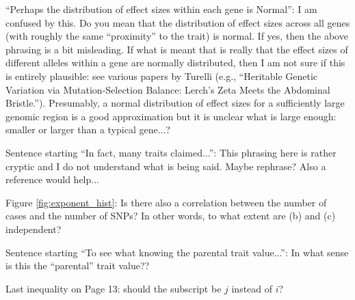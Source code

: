 \reply{
}

\begin{point}{\revref}
    ``Perhaps the distribution of effect sizes within each gene is Normal'': I am confused by this. Do you mean that the distribution of effect sizes across all genes (with roughly the same ``proximity'' to the trait) is normal. If yes, then the above phrasing is a bit misleading. If what is meant that is really that the effect sizes of different alleles within a gene are normally distributed, then I am not sure if this is entirely plausible: see various papers by Turelli (e.g., ``Heritable Genetic Variation via Mutation-Selection Balance: Lerch's Zeta Meets the Abdominal Bristle.''). Presumably, a normal distribution of effect sizes for a sufficiently large genomic region is a good approximation but it is unclear what is large enough: smaller or larger than a typical gene...?
\end{point}


\begin{point}{\revref}
    Sentence starting ``In fact, many traits claimed...'': This phrasing here is rather cryptic and I do not understand what is being said. Maybe rephrase? Also a reference would help...
\end{point}

\reply{
}

\begin{point}{}
    Figure \ref{fig:exponent_hist}: Is there also a correlation between the number of cases and the number of SNPs? In other words, to what extent are (b) and (c) independent?
\end{point}


\begin{point}{\revref}
    Sentence starting ``To see what knowing the parental trait value...'': In what sense is this the ``parental'' trait value??
\end{point}

\reply{
}

\begin{point}{}
    Last inequality on Page 13: should the subscript be $j$ instead of $i$?
\end{point}

